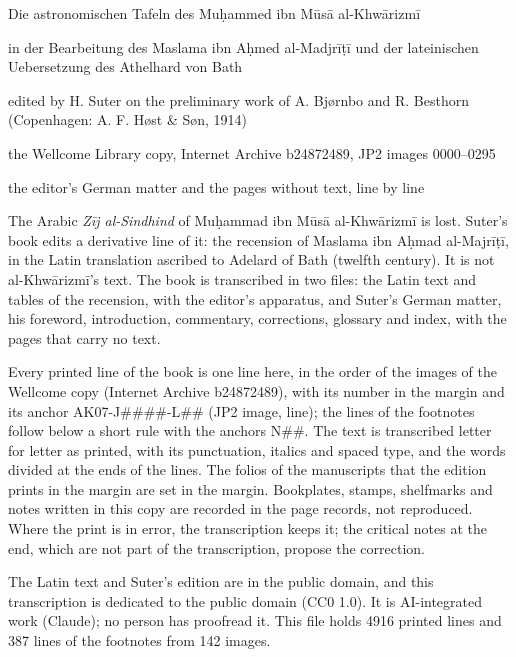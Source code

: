 \documentclass[11pt]{article}
\begin{document}
\thispagestyle{empty}
\begin{center}\LARGE Die astronomischen Tafeln des Muḥammed ibn Mūsā al-Khwārizmī\par\vspace{3mm}\large in der Bearbeitung des Maslama ibn Aḥmed al-Madjrīṭī und der lateinischen Uebersetzung des Athelhard von Bath\par\vspace{4mm}\normalsize edited by H. Suter on the preliminary work of A. Bjørnbo and R. Besthorn\\(Copenhagen: A. F. Høst \& Søn, 1914)\par\vspace{3mm}the Wellcome Library copy, Internet Archive b24872489, JP2 images 0000–0295\par\vspace{4mm}\large the editor’s German matter and the pages without text, line by line\end{center}\vspace{6mm}
\noindent The Arabic \textit{Zīj al-Sindhind} of Muḥammad ibn Mūsā al-Khwārizmī is lost. Suter’s book edits a derivative line of it: the recension of Maslama ibn Aḥmad al-Majrīṭī, in the Latin translation ascribed to Adelard of Bath (twelfth century). It is not al-Khwārizmī’s text. The book is transcribed in two files: the Latin text and tables of the recension, with the editor’s apparatus, and Suter’s German matter, his foreword, introduction, commentary, corrections, glossary and index, with the pages that carry no text.
\par\smallskip\noindent Every printed line of the book is one line here, in the order of the images of the Wellcome copy (Internet Archive b24872489), with its number in the margin and its anchor AK07-J\#\#\#\#-L\#\# (JP2 image, line); the lines of the footnotes follow below a short rule with the anchors N\#\#. The text is transcribed letter for letter as printed, with its punctuation, italics and spaced type, and the words divided at the ends of the lines. The folios of the manuscripts that the edition prints in the margin are set in the margin. Bookplates, stamps, shelfmarks and notes written in this copy are recorded in the page records, not reproduced. Where the print is in error, the transcription keeps it; the critical notes at the end, which are not part of the transcription, propose the correction.
\par\smallskip\noindent The Latin text and Suter’s edition are in the public domain, and this transcription is dedicated to the public domain (CC0 1.0). It is AI-integrated work (Claude); no person has proofread it. This file holds 4916 printed lines and 387 lines of the footnotes from 142 images.\par\clearpage
\end{document}

